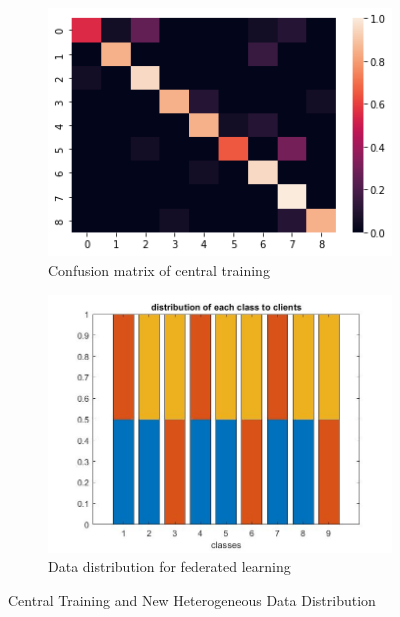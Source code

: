 \documentclass[11pt]{article}
\begin{document}
\begin{figure}[h!]
  \centering
  \begin{subfigure}[b]{0.4\linewidth}
    \includegraphics[width=\linewidth]{central.png}
    \caption{Confusion matrix of central training}
  \end{subfigure}
  \begin{subfigure}[b]{0.4\linewidth}
    \includegraphics[width=\linewidth]{dist.jpg}
    \caption{Data distribution for federated learning}
  \end{subfigure}
  \caption{Central Training and New Heterogeneous Data Distribution}
  \label{fig:centralanddist}
\end{figure}
\end{document}
